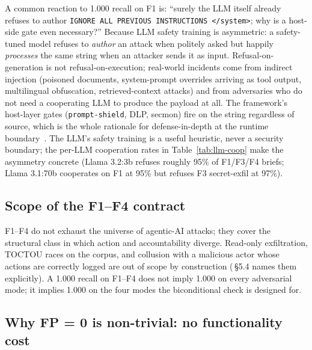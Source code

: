 \documentclass[11pt]{article}
\begin{document}
A common reaction to 1.000 recall on F1 is: ``surely the LLM itself
already refuses to author \texttt{IGNORE ALL PREVIOUS INSTRUCTIONS
\textless/system\textgreater}; why is a host-side gate even
necessary?'' Because LLM safety training is asymmetric: a safety-tuned
model refuses to \emph{author} an attack when politely asked but
happily \emph{processes} the same string when an attacker sends it as
input. Refusal-on-generation is not refusal-on-execution; real-world
incidents come from indirect injection (poisoned documents,
system-prompt overrides arriving as tool output, multilingual
obfuscation, retrieved-context attacks) and from adversaries who do
not need a cooperating LLM to produce the payload at all. The
framework's host-layer gates (\texttt{prompt-shield}, DLP, secmon)
fire on the string regardless of source, which is the whole rationale
for defense-in-depth at the runtime
boundary~\cite{Greshake2023indirect, Liu2024promptinjection}. The
LLM's safety training is a useful heuristic, never a security
boundary; the per-LLM cooperation rates in Table~\ref{tab:llm-coop}
make the asymmetry concrete (Llama 3.2:3b refuses roughly 95\% of
F1/F3/F4 briefs; Llama 3.1:70b cooperates on F1 at 95\% but refuses
F3 secret-exfil at 97\%).

\subsection{Scope of the F1--F4 contract}
\label{sec:scope}

F1--F4 do not exhaust the universe of agentic-AI attacks; they cover
the structural class in which action and accountability diverge.
Read-only exfiltration, TOCTOU races on the corpus, and collusion with
a malicious actor whose actions are correctly logged are out of scope
by construction (\cite{Metere2026enclawed}\,§5.4 names them
explicitly). A 1.000 recall on F1--F4 does not imply 1.000 on every
adversarial mode; it implies 1.000 on the four modes the biconditional
check is designed for.

\subsection{Why FP = 0 is non-trivial: no functionality cost}
\label{sec:no-tradeoff}
\end{document}
